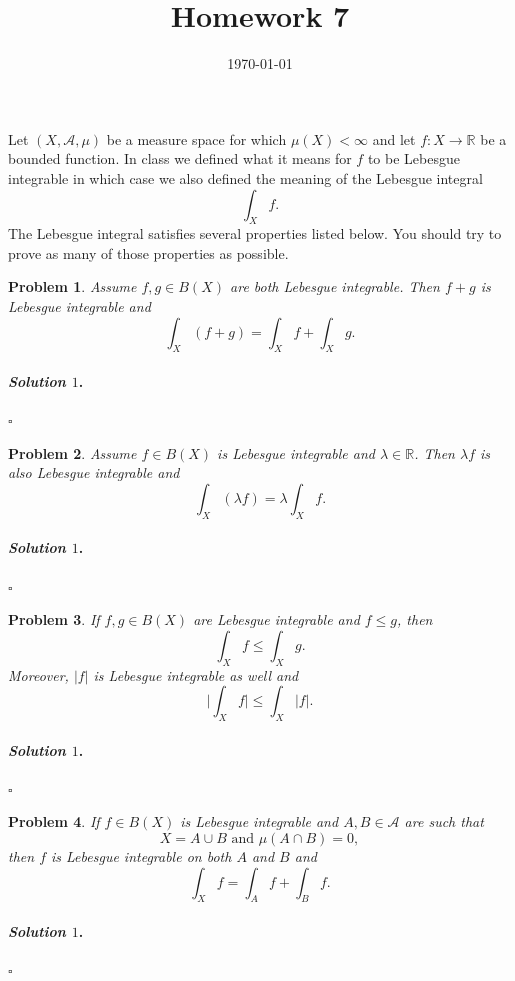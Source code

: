 \documentclass[reqno]{amsart}
\theoremstyle{plain}
\newtheorem{problem}{Problem}
\theoremstyle{definition}
\newenvironment{solution1}{\paragraph{\emph{Solution $1$}.}}{\hfill$\square$}
\begin{document}
 

\title[Homework 7]{Homework 7}

\date{\today} 
\maketitle 


Let $(X,\mathcal{A},\mu)$ be a measure space for which $\mu(X) < \infty$ and let $f:X \rightarrow \mathbb{R}$ be a bounded function.  In class we defined what it means for $f$ to be Lebesgue integrable in which case we also defined the meaning of the Lebesgue integral
$$\int_{X}f. $$
The Lebesgue integral satisfies several properties listed below.  You should try to prove as many of those properties as possible.
\begin{problem}
Assume $f, g \in B(X)$ are both Lebesgue integrable.  Then $f+g$ is Lebesgue integrable and
$$\int_{X}(f+g) = \int_{X}f + \int_{X}g. $$
\end{problem}
\begin{solution1}

\end{solution1}

\begin{problem}
Assume $f \in B(X)$ is Lebesgue integrable and $\lambda \in \mathbb{R}$.  Then $\lambda f$ is also Lebesgue integrable and
$$\int_{X}(\lambda f) = \lambda \int_{X}f. $$
\end{problem}
\begin{solution1}

\end{solution1}


\begin{problem}
If $f,g \in B(X)$ are Lebesgue integrable and $f \le g$, then 
$$\int_{X}f \le \int_{X}g. $$
Moreover, $|f|$ is Lebesgue integrable as well and
$$\Big|\int_{X}f \Big| \le \int_{X} |f|. $$
\end{problem}
\begin{solution1}

\end{solution1}


\begin{problem}
If $f \in B(X)$ is Lebesgue integrable and $A, B \in \mathcal{A}$ are such that 
$$X = A \cup B \text{ and } \mu(A \cap B) = 0, $$
then $f$ is Lebesgue integrable on both $A$ and $B$ and
$$\int_{X}f = \int_{A}f + \int_{B}f. $$
\end{problem}
\begin{solution1}

\end{solution1}
\end{document}
